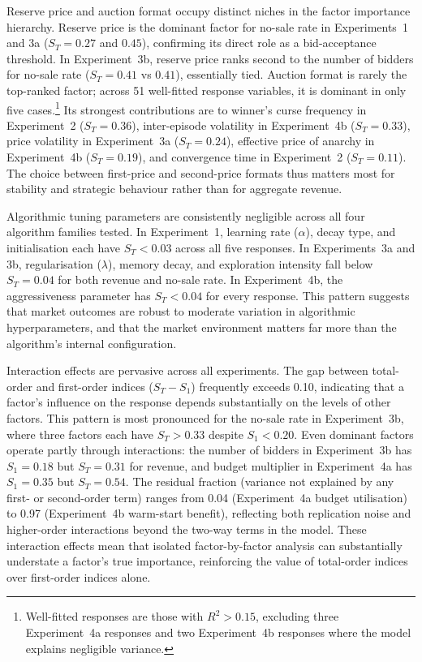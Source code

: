 Reserve price and auction format occupy distinct niches in the factor importance hierarchy. Reserve price is the dominant factor for no-sale rate in Experiments~1 and 3a ($S_T = 0.27$ and $0.45$), confirming its direct role as a bid-acceptance threshold. In Experiment~3b, reserve price ranks second to the number of bidders for no-sale rate ($S_T = 0.41$ vs $0.41$), essentially tied. Auction format is rarely the top-ranked factor; across 51 well-fitted response variables, it is dominant in only five cases.\footnote{Well-fitted responses are those with $R^2 > 0.15$, excluding three Experiment~4a responses and two Experiment~4b responses where the model explains negligible variance.} Its strongest contributions are to winner's curse frequency in Experiment~2 ($S_T = 0.36$), inter-episode volatility in Experiment~4b ($S_T = 0.33$), price volatility in Experiment~3a ($S_T = 0.24$), effective price of anarchy in Experiment~4b ($S_T = 0.19$), and convergence time in Experiment~2 ($S_T = 0.11$). The choice between first-price and second-price formats thus matters most for stability and strategic behaviour rather than for aggregate revenue.

Algorithmic tuning parameters are consistently negligible across all four algorithm families tested. In Experiment~1, learning rate ($\alpha$), decay type, and initialisation each have $S_T < 0.03$ across all five responses. In Experiments~3a and 3b, regularisation ($\lambda$), memory decay, and exploration intensity fall below $S_T = 0.04$ for both revenue and no-sale rate. In Experiment~4b, the aggressiveness parameter has $S_T < 0.04$ for every response. This pattern suggests that market outcomes are robust to moderate variation in algorithmic hyperparameters, and that the market environment matters far more than the algorithm's internal configuration.

Interaction effects are pervasive across all experiments. The gap between total-order and first-order indices ($S_T - S_1$) frequently exceeds 0.10, indicating that a factor's influence on the response depends substantially on the levels of other factors. This pattern is most pronounced for the no-sale rate in Experiment~3b, where three factors each have $S_T > 0.33$ despite $S_1 < 0.20$. Even dominant factors operate partly through interactions: the number of bidders in Experiment~3b has $S_1 = 0.18$ but $S_T = 0.31$ for revenue, and budget multiplier in Experiment~4a has $S_1 = 0.35$ but $S_T = 0.54$. The residual fraction (variance not explained by any first- or second-order term) ranges from 0.04 (Experiment~4a budget utilisation) to 0.97 (Experiment~4b warm-start benefit), reflecting both replication noise and higher-order interactions beyond the two-way terms in the model. These interaction effects mean that isolated factor-by-factor analysis can substantially understate a factor's true importance, reinforcing the value of total-order indices over first-order indices alone.
